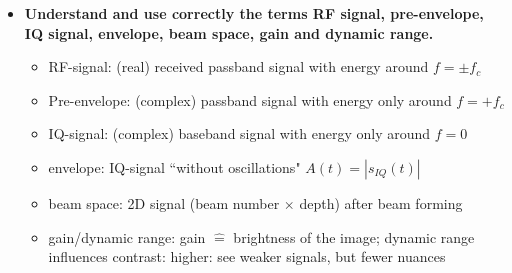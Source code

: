 \documentclass[10pt,a4paper,noendnumber=true]{scrartcl}
\begin{document}
\begin{itemize}
\begin{figure}[H]
\centering
{}
\\
\qquad
{}
\\
\qquad
{}
\end{figure}

\item \textbf{Understand and use correctly the terms RF signal, pre-envelope, IQ signal, envelope, beam space, gain and dynamic range.}
\begin{itemize}
\item RF-signal: (real) received passband signal with energy around $f=\pm f_c$
\item Pre-envelope: (complex) passband signal with energy only around $f=+ f_c$
\item IQ-signal: (complex) baseband signal with energy only around $f=0$
\item envelope: IQ-signal ``without oscillations" $A(t)=\left|s_{IQ}(t)\right|$
\item beam space: 2D signal (beam number $\times$ depth) after beam forming
\item gain/dynamic range: gain $\hat{=}$ brightness of the image; dynamic range influences contrast: higher: see weaker signals, but fewer nuances
\end{itemize}



\end{itemize}
\end{document}
